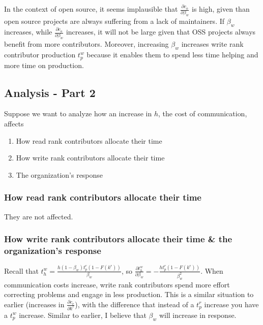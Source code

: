 \documentclass[source/paper/main.tex]{subfiles}
\begin{document}
In the context of open source, it seems implausible that $\frac{\partial c_o}{\partial \beta_w}$ is high, given than open source projects are always suffering from a lack of maintainers. If $\beta_w$ increases, while $\frac{\partial c_o}{\partial \beta_w}$ increases, it will not be large given that OSS projects always benefit from more contributors. Moreover, increasing $\beta_w$ increases write rank contributor production $t_p^w$ because it enables them to spend less time helping and more time on production. 


\subsection{Analysis - Part 2}
Suppose we want to analyze how an increase in $h$, the cost of communication, affects
\begin{enumerate}
    \item How read rank contributors allocate their time
    \item How write rank contributors allocate their time
    \item The organization's response
\end{enumerate}
\subsubsection{How read rank contributors allocate their time}
They are not affected. 
\subsubsection{How write rank contributors allocate their time \& the organization's response}
Recall that $t_h^w = \frac{ h (1-\beta_w) t_p^r(1-F(k^r))}{\beta_w}$, so $\frac{\partial t_h^w}{\partial \beta_w} = -\frac{h t_p^r(1-F(k^r))}{\beta_w^2}$. 
When communication costs increase, write rank contributors spend more effort correcting problems and engage in less production. This is a similar situation to earlier (increases in $\frac{\partial c_r}{\partial k^r}$), with the difference that instead of a $t_p^r$ increase you have a $t_p^w$ increase. Similar to earlier, I believe that $\beta_w$ will increase in response. 
\end{document}
